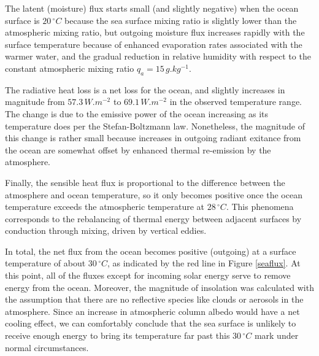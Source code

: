 \documentclass[12pt]{article}
\begin{document}
The latent (moisture) flux starts small (and slightly negative) when the ocean surface is $20\,\si{^\circ C}$ because the sea surface mixing ratio is slightly lower than the atmospheric mixing ratio, but outgoing moisture flux increases rapidly with the surface temperature because of enhanced evaporation rates associated with the warmer water, and the gradual reduction in relative humidity with respect to the constant atmospheric mixing ratio $q_a=15\,\si{g.kg^{-1}}$.

The radiative heat loss is a net loss for the ocean, and slightly increases in magnitude from $57.3\,\si{W.m^{-2}}$ to $69.1\,\si{W.m^{-2}}$ in the observed temperature range. The change is due to the emissive power of the ocean increasing as its temperature does per the Stefan-Boltzmann law. Nonetheless, the magnitude of this change is rather small because increases in outgoing radiant exitance from the ocean are somewhat offset by enhanced thermal re-emission by the atmosphere.

Finally, the sensible heat flux is proportional to the difference between the atmosphere and ocean temperature, so it only becomes positive once the ocean temperature exceeds the atmospheric temperature at $28\,\si{^\circ C}$. This phenomena corresponds to the rebalancing of thermal energy between adjacent surfaces by conduction through mixing, driven by vertical eddies.

In total, the net flux from the ocean becomes positive (outgoing) at a surface temperature of about $30\,\si{^\circ C}$, as indicated by the red line in Figure \ref{seaflux}. At this point, all of the fluxes except for incoming solar energy serve to remove energy from the ocean. Moreover, the magnitude of insolation was calculated with the assumption that there are no reflective species like clouds or aerosols in the atmosphere. Since an increase in atmospheric column albedo would have a net cooling effect, we can comfortably conclude that the sea surface is unlikely to receive enough energy to bring its temperature far past this $30\,\si{^\circ C}$ mark under normal circumstances.
\end{document}
